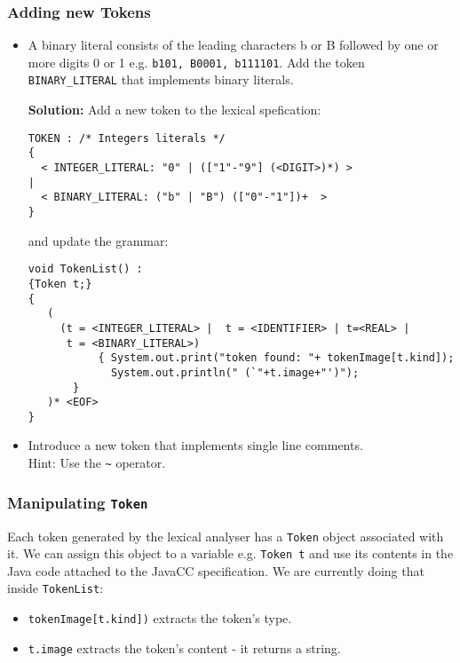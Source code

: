 \documentclass{article}
\begin{document}
\subsubsection*{Adding new Tokens}

\begin{itemize}
\item A binary literal consists of the leading characters b or B followed by one or more digits 0 or 1 e.g. {\tt b101, B0001, b111101}. Add the token \verb+BINARY_LITERAL+ that implements binary literals.

\noindent \textbf{Solution:} Add a new token to the lexical spefication:
\begin{verbatim}
TOKEN : /* Integers literals */
{
  < INTEGER_LITERAL: "0" | (["1"-"9"] (<DIGIT>)*) >
|
  < BINARY_LITERAL: ("b" | "B") (["0"-"1"])+  >
}
\end{verbatim}

and update the grammar:

\begin{verbatim}
void TokenList() :
{Token t;}
{
   (
     (t = <INTEGER_LITERAL> |  t = <IDENTIFIER> | t=<REAL> |
      t = <BINARY_LITERAL>)
           { System.out.print("token found: "+ tokenImage[t.kind]);
             System.out.println(" (`"+t.image+"')"); 
	   }
   )* <EOF>
}
\end{verbatim}

\item Introduce a new token that implements single line comments. \\
Hint: Use the \verb+~+ operator.

\end{itemize}


\subsubsection*{Manipulating {\tt Token}}

Each token generated by the lexical analyser has a {\tt Token} object associated with it. We can assign this object to a variable e.g. {\tt Token t} and use its contents in the Java code attached to the JavaCC specification. We are currently doing that inside {\tt TokenList}:
\begin{itemize}
\item \verb+tokenImage[t.kind])+ extracts the token's type.
\item \verb+t.image+ extracts the token's content - it returns a string.
\end{itemize}
\end{document}

